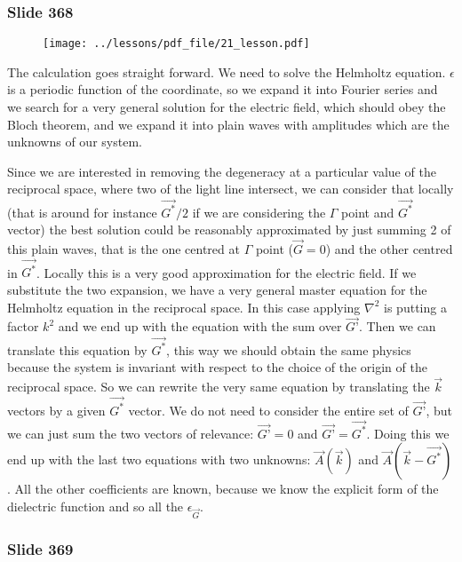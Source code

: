 \documentclass[../main/main.tex]{subfiles}
\begin{document}
\newpage

\subsubsection{Slide 368}

\begin{figure}[h!]
\centering
\texttt{[image: ../lessons/pdf\_file/21\_lesson.pdf]}
\end{figure}

The calculation goes straight forward. We need to solve the Helmholtz equation. 
$\epsilon$ is a periodic function of the coordinate, so we expand it  into Fourier series and we search for a very general solution for the electric field, which should obey the Bloch theorem, and we expand it into plain waves with amplitudes which are the unknowns of our system.

Since we are interested in removing the degeneracy at a particular value of the reciprocal space, where two of the light line intersect, we can consider that locally (that is around for instance $\vec{G^*}/2$ if we are considering the $\Gamma$ point and $\vec{G^*}$ vector) the best solution could be reasonably approximated by just summing 2 of this plain waves, that is the one centred at $\Gamma$ point ($\vec{G}=0$) and the other centred in $\vec{G^*}$.
Locally this is a very good approximation for the electric field.
If we substitute the two expansion, we have a very general master equation for the Helmholtz equation in the reciprocal space.
In this case applying $\nabla^2$ is putting a factor $k^2$ and we end up with the equation with the sum over $\vec{G’}$.  Then we can translate this equation by $\vec{G^*}$, this way we should obtain the same physics because the system is invariant with respect to the choice of the origin of the reciprocal space. 
So we can rewrite the very same equation by translating the $\vec{k}$ vectors by a given $\vec{G^*}$ vector.
We do not need to consider the entire set of $\vec{G’}$, but we can just sum the two vectors of relevance: $\vec{G’}=0$ and $\vec{G’}=\vec{G^*}$.
Doing this we end up with the last two equations with two unknowns: $\vec{A}(\vec{k})$ and $\vec{A}(\vec{k}-\vec{G^*})$.
All the other coefficients are known, because we know the explicit form of the dielectric function and so all the $\epsilon_\vec{G}$.

\newpage

\subsubsection{Slide 369}
\end{document}
